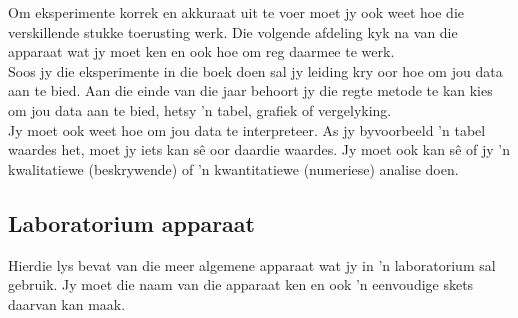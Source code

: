 Om eksperimente korrek en akkuraat uit te voer moet jy ook weet hoe die verskillende stukke toerusting werk. Die volgende afdeling kyk na van die apparaat wat jy moet ken en ook hoe om reg daarmee te werk. \\
Soos jy die eksperimente in die boek doen sal jy leiding kry oor hoe om jou data aan te bied. Aan die einde van die jaar behoort jy die regte metode te kan kies om jou data aan te bied, hetsy  'n tabel, grafiek of vergelyking.\\
Jy moet ook weet hoe om jou data te interpreteer. As jy byvoorbeeld  'n tabel waardes het, moet jy iets kan sê oor daardie waardes. Jy moet ook kan sê of jy  'n kwalitatiewe (beskrywende) of  'n kwantitatiewe (numeriese) analise doen.
\subsection*{Laboratorium apparaat}
Hierdie lys bevat van die meer algemene apparaat wat jy in  'n laboratorium sal gebruik. Jy moet die naam van die apparaat ken en ook  'n eenvoudige skets daarvan kan maak.
